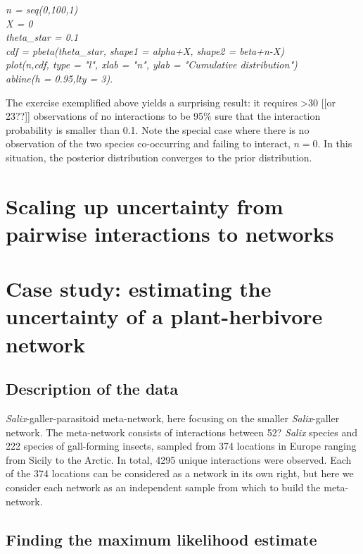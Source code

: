 \documentclass[12pt]{article}
\begin{document}
  \vspace{12pt}
\noindent\emph{
    \noindent n = seq(0,100,1)
    \\\noindent X = 0
    \\\noindent theta\_star = 0.1
    \\\noindent cdf = pbeta(theta\_star, shape1 = alpha+X, shape2 = beta+n-X)
    \\\noindent plot(n,cdf, type = "l", xlab = "n", ylab = "Cumulative distribution")
    \\\noindent abline(h = 0.95,lty = 3)}.
  \vspace{12pt}

The exercise exemplified above yields a surprising result: it requires \textgreater30 [[or 23??]] observations of no interactions to be 95\% sure that the interaction probability is smaller than 0.1. Note the special case where there is no observation of the two species co-occurring and failing to interact, $n = 0$. In this situation, the posterior distribution converges to the prior distribution. 


\section*{Scaling up uncertainty from pairwise interactions to networks}






\section*{Case study: estimating the uncertainty of a plant-herbivore network}

    \subsection*{Description of the data}

      \emph{Salix}-galler-parasitoid meta-network, here focusing on the smaller \emph{Salix}-galler network. The meta-network consists of interactions between 52? \emph{Salix} species and 222 species of gall-forming insects, sampled from 374 locations in Europe ranging from Sicily to the Arctic. In total, 4295 unique interactions were observed. Each of the 374 locations can be considered as a network in its own right, but here we consider each network as an independent sample from which to build the meta-network.


  \subsection*{Finding the maximum likelihood estimate}
\end{document}
